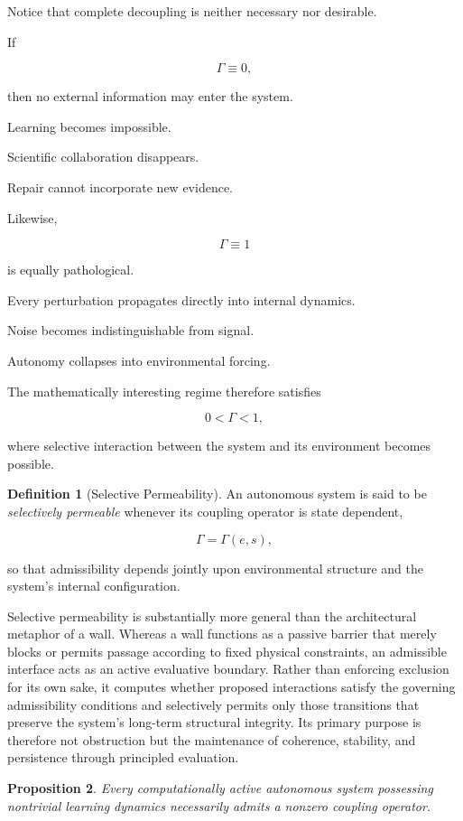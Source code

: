 \documentclass[11pt,oneside]{book}
\numberwithin{equation}{chapter}
\theoremstyle{definition}
\newtheorem{definition}{Definition}[chapter]
\theoremstyle{plain}
\newtheorem{proposition}[definition]{Proposition}
\begin{document}
Notice that complete decoupling is neither necessary nor desirable.

If

\[
\Gamma\equiv0,
\]

then no external information may enter the system.

Learning becomes impossible.

Scientific collaboration disappears.

Repair cannot incorporate new evidence.

Likewise,

\[
\Gamma\equiv1
\]

is equally pathological.

Every perturbation propagates directly into internal dynamics.

Noise becomes indistinguishable from signal.

Autonomy collapses into environmental forcing.

The mathematically interesting regime therefore satisfies

\[
0 < \Gamma < 1,
\]

where selective interaction between the system and its environment becomes possible.

\begin{definition}[Selective Permeability]

An autonomous system is said to be \emph{selectively permeable} whenever its coupling operator is state dependent,

\[
\Gamma = \Gamma(e,s),
\]

so that admissibility depends jointly upon environmental structure and the system's internal configuration.

\end{definition}

Selective permeability is substantially more general than the architectural metaphor of a wall. Whereas a wall functions as a passive barrier that merely blocks or permits passage according to fixed physical constraints, an admissible interface acts as an active evaluative boundary. Rather than enforcing exclusion for its own sake, it computes whether proposed interactions satisfy the governing admissibility conditions and selectively permits only those transitions that preserve the system's long-term structural integrity. Its primary purpose is therefore not obstruction but the maintenance of coherence, stability, and persistence through principled evaluation.

\begin{proposition}

Every computationally active autonomous system possessing nontrivial learning dynamics necessarily admits a nonzero coupling operator.

\end{proposition}
\end{document}
